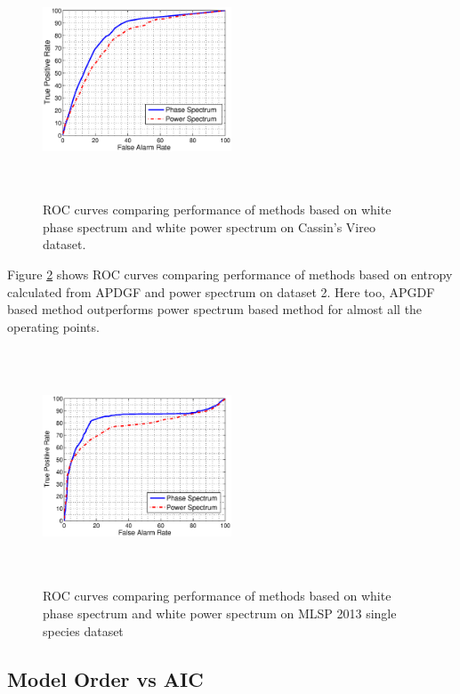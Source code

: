 \documentclass[a4paper]{article}
\begin{document}
\begin{figure}[h]
\centering
\includegraphics[width=0.5\textwidth,height=7cm]{gd_1.eps}
\caption{ROC  curves  comparing  performance  of  methods based on white phase spectrum and white power spectrum on Cassin's Vireo dataset.}
\label{fig:ROCdata1}
\end{figure}

 Figure \ref{fig:ROCdata2} shows ROC curves comparing performance of methods
 based on entropy calculated from APDGF  and power spectrum on dataset 2. Here
 too, APGDF based method outperforms power spectrum based method for almost all
 the operating points. 

 
\begin{figure}[!ht]
	\centering
	\includegraphics[width=0.5\textwidth,height=7cm] {gd_2.eps}
	\caption{ROC curves comparing performance of methods based on white phase spectrum and white power spectrum on MLSP 2013 single species dataset }   
	\label{fig:ROCdata2}
\end{figure} 




 \subsection{Model Order  vs AIC}
 
\end{document}
